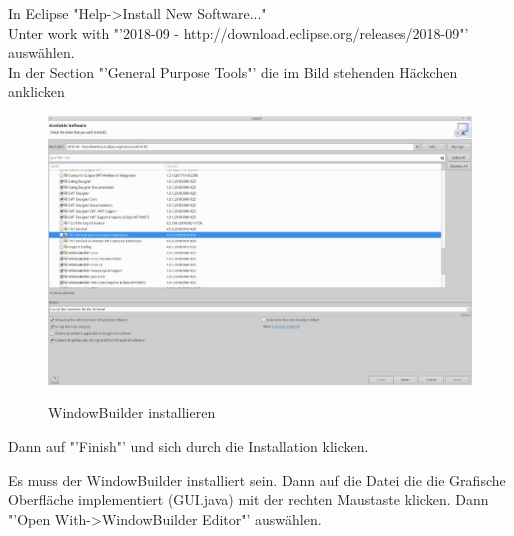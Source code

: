 In Eclipse "Help->Install New Software..."\\
Unter work with "'2018-09 - http://download.eclipse.org/releases/2018-09"' auswählen.\\
In der Section "'General Purpose Tools"' die im Bild stehenden Häckchen anklicken\\	
\begin{figure}[hbtp]
\centering
\includegraphics[scale=0.4]{Bilder/installWindowBuilder}\\
\caption{WindowBuilder installieren}
\end{figure}
Dann auf "'Finish"' und sich durch die Installation klicken.
\nsecend

Es muss der WindowBuilder installiert sein. Dann auf die Datei die die Grafische Oberfläche implementiert (GUI.java) mit der rechten Maustaste klicken. Dann "'Open With->WindowBuilder Editor"' auswählen.
\nsecend
\nsecend %

